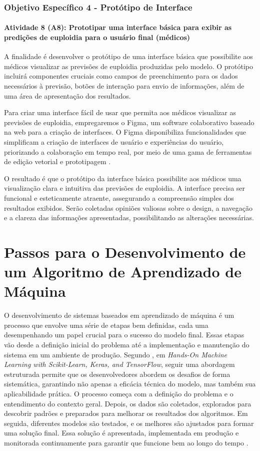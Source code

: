 \subsubsection{\textbf{Objetivo Específico 4} - Protótipo de Interface}

\paragraph{\textbf{Atividade 8 (A8):} Prototipar uma interface básica para exibir as predições de euploidia para o usuário final (médicos)}

A finalidade é desenvolver o protótipo de uma interface básica que possibilite aos médicos visualizar as previsões de euploidia produzidas pelo modelo. O protótipo incluirá componentes cruciais como campos de preenchimento para os dados necessários à previsão, botões de interação para envio de informações, além de uma área de apresentação dos resultados.

Para criar uma interface fácil de usar que permita aos médicos visualizar as previsões de euploidia, empregaremos o Figma, um software colaborativo baseado na web para a criação de interfaces. O Figma disponibiliza funcionalidades que simplificam a criação de interfaces de usuário e experiências do usuário, priorizando a colaboração em tempo real, por meio de uma gama de ferramentas de edição vetorial e prototipagem \cite{figma2024}.

O resultado é que o protótipo da interface básica possibilite aos médicos uma visualização clara e intuitiva das previsões de euploidia. A interface precisa ser funcional e esteticamente atraente, assegurando a compreensão simples dos resultados exibidos. Serão coletadas opiniões valiosas sobre o design, a navegação e a clareza das informações apresentadas, possibilitando as alterações necessárias.

\section{Passos para o Desenvolvimento de um Algoritmo de Aprendizado de Máquina}

O desenvolvimento de sistemas baseados em aprendizado de máquina é um processo que envolve uma série de etapas bem definidas, cada uma desempenhando um papel crucial para o sucesso do modelo final. Essas etapas vão desde a definição inicial do problema até a implementação e manutenção do sistema em um ambiente de produção. Segundo , em \textit{Hands-On Machine Learning with Scikit-Learn, Keras, and TensorFlow}, seguir uma abordagem estruturada permite que os desenvolvedores abordem os desafios de forma sistemática, garantindo não apenas a eficácia técnica do modelo, mas também sua aplicabilidade prática. O processo começa com a definição do problema e o entendimento do contexto geral. Depois, os dados são coletados, explorados para descobrir padrões e preparados para melhorar os resultados dos algoritmos. Em seguida, diferentes modelos são testados, e os melhores são ajustados para formar uma solução final. Essa solução é apresentada, implementada em produção e monitorada continuamente para garantir que funcione bem ao longo do tempo \cite{geron2017}.

